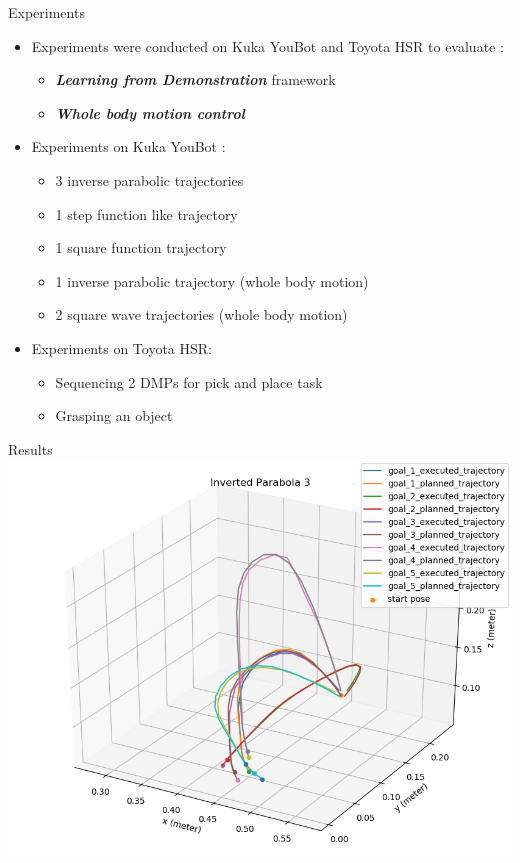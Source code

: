 \documentclass{beamer}
\begin{document}
	\begin{frame}{Experiments}
		\begin{itemize}
			\item Experiments were conducted on Kuka YouBot and Toyota HSR to evaluate :
			\begin{itemize}
				\item \textbf{\textit{Learning from Demonstration}} framework
				\item \textbf{\textit{Whole body motion control}}
			\end{itemize}  
			\item Experiments on Kuka YouBot :
			\begin{itemize}
				\item 3 inverse parabolic trajectories 
				\item 1 step function like trajectory 
				\item 1 square function trajectory 
				\item 1 inverse parabolic trajectory (whole body motion)
				\item 2 square wave trajectories (whole body motion)
			\end{itemize}
			\item Experiments on Toyota HSR:
			\begin{itemize}
				\item Sequencing 2 DMPs for pick and place task
				\item Grasping an object
			\end{itemize}
		\end{itemize}
	\end{frame}
	
	\begin{frame}{Results}
		\centering
		\includegraphics[scale=0.4]{images/1/inv_par_3.png}
	\end{frame}
	
\end{document}
